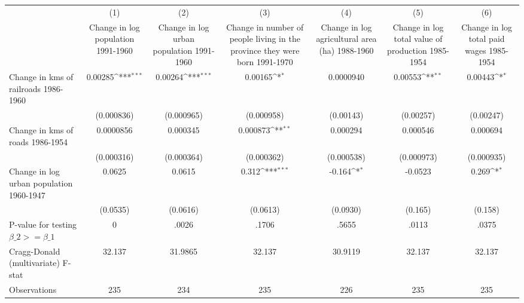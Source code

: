 {
\def\sym#1{\ifmmode^{#1}\else\(^{#1}\)\fi}
\begin{tabular}{l*{6}{c}}
\hline\hline
                &\multicolumn{1}{c}{(1)}&\multicolumn{1}{c}{(2)}&\multicolumn{1}{c}{(3)}&\multicolumn{1}{c}{(4)}&\multicolumn{1}{c}{(5)}&\multicolumn{1}{c}{(6)}\\
                &\multicolumn{1}{c}{Change in log population 1991-1960}&\multicolumn{1}{c}{Change in log urban population 1991-1960}&\multicolumn{1}{c}{Change in number of people living in the province they were born 1991-1970}&\multicolumn{1}{c}{Change in log agricultural area (ha) 1988-1960}&\multicolumn{1}{c}{Change in log total value of production 1985-1954}&\multicolumn{1}{c}{Change in log total paid wages 1985-1954}\\
\hline
Change in kms of railroads 1986-1960&  0.00285\sym{***}&  0.00264\sym{***}&  0.00165\sym{*}  &0.0000940         &  0.00553\sym{**} &  0.00443\sym{*}  \\
                &(0.000836)         &(0.000965)         &(0.000958)         &(0.00143)         &(0.00257)         &(0.00247)         \\
[1em]
Change in kms of roads 1986-1954&0.0000856         & 0.000345         & 0.000873\sym{**} & 0.000294         & 0.000546         & 0.000694         \\
                &(0.000316)         &(0.000364)         &(0.000362)         &(0.000538)         &(0.000973)         &(0.000935)         \\
[1em]
Change in log urban population 1960-1947&   0.0625         &   0.0615         &    0.312\sym{***}&   -0.164\sym{*}  &  -0.0523         &    0.269\sym{*}  \\
                & (0.0535)         & (0.0616)         & (0.0613)         & (0.0930)         &  (0.165)         &  (0.158)         \\
\hline
P-value for testing $\beta\_{2} >= \beta\_{1}$&        0         &    .0026         &    .1706         &    .5655         &    .0113         &    .0375         \\
Cragg-Donald (multivariate) F-stat&   32.137         &  31.9865         &   32.137         &  30.9119         &   32.137         &   32.137         \\
Observations    &      235         &      234         &      235         &      226         &      235         &      235         \\
\hline\hline
\end{tabular}
}
